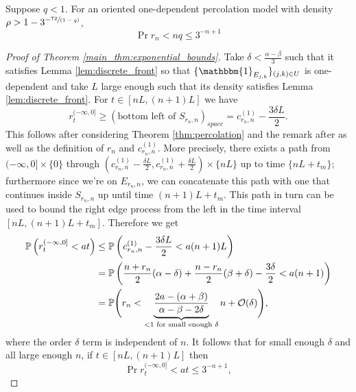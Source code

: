 \begin{lemma}\label{lem:discrete_front}
Suppose $q < 1$. For an oriented one-dependent percolation model with density $\rho > 1 - 3^{-\sfrac{72}{(1 - q)}}$, 
\begin{equation}\nonumber
\Pr{r_n < n q} \leq 3^{-n + 1}
\end{equation}
\end{lemma}

\begin{proof}[Proof of Theorem \ref{main_thm:exponential_bounds}]
Take $\delta < \frac{\alpha - \beta}{3}$ such that it satisfies Lemma \ref{lem:discrete_front} so that $\{\mathbbm{1}_{E_{j,k}}\}_{(j,k) \in U}$ is one-dependent and take $L$ large enough such that its density satisfies Lemma \ref{lem:discrete_front}. For $t \in [nL, (n + 1)L]$ we have
\begin{equation}\nonumber
r^{(-\infty, 0]}_t \geq (\text{bottom left of $S_{r_n,n}$})_{space} = c^{(1)}_{r_n, n} - \frac{3 \delta L}{2}.  
\end{equation}
This follows after considering Theorem \ref{thm:percolation} and the remark after as well as the definition of $r_n$ and $c^{(1)}_{r_n, n}$. More precisely, there exists a path from $(-\infty, 0] \times \{0\}$ through $(c^{(1)}_{r_n, n} - \frac{\delta L}{2}, c^{(1)}_{r_n, n} + \frac{\delta L}{2}) \times \{nL\}$ up to time $\{nL + t_m\}$; furthermore since we're on $E_{r_n, n}$, we can concatenate this path with one that continues inside $S_{r_n, n}$ up until time $(n + 1)L + t_m$. This path in turn can be used to bound the right edge process from the left in the time interval $[nL, (n+1)L + t_m]$. Therefore we get
\begin{align*}
\Pr{r^{(-\infty, 0]}_t < at} &\leq \Pr{c^{(1)}_{r_n, n} - \frac{3 \delta L}{2} < a(n + 1)L} \\
			  &= \Pr{\frac{n + r_n}{2}(\alpha - \delta) + \frac{n - r_n}{2}(\beta + \delta) - \frac{3 \delta}{2} < a(n + 1)} \\
			  &= \P \Bigg(r_n < \underbrace{\frac{2a - (\alpha + \beta)}{\alpha - \beta - 2\delta}}_{ < 1 \text{ for small enough } \delta} n + \cal{O}(\delta) \Bigg), 
\end{align*}
where the order $\delta$ term is independent of $n$. It follows that for small enough $\delta$ and all large enough $n$, if $t \in [nL, (n+1)L]$ then
\begin{equation}\nonumber
\Pr{r^{(-\infty, 0]}_t < at} \leq 3^{-n + 1}, 
\end{equation}

\end{proof}
